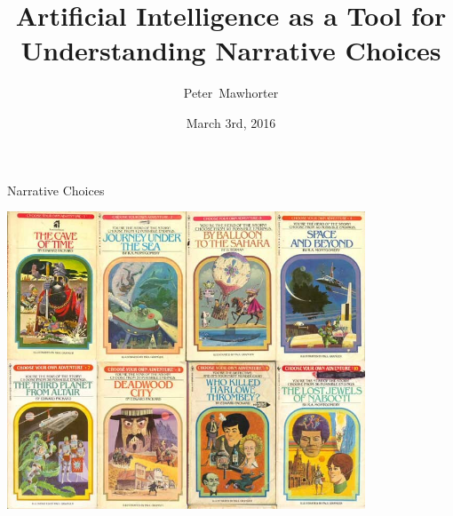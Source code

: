 \documentclass[xcolor=x11names]{beamer}
\title[AI for Understanding Narrative Choices] 
{%
Artificial Intelligence as a Tool for Understanding Narrative Choices%
}
\author[Mawhorter]
{%
  Peter~Mawhorter
}
\institute[UCSC]
{%
  Department of Computer Science \\
  University of California Santa Cruz
}
\date[2016-3-3]
{%
  March 3rd, 2016
}
\begin{document}
\begin{frame}
  \titlepage
\end{frame}

\begin{frame}{Narrative Choices}
\begin{center}
  \includegraphics[width=0.8\textwidth]{res/cyoa-covers.jpg}
\end{center}
\end{frame}
\end{document}
